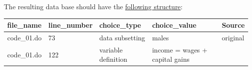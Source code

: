 \documentclass[]{book}
\begin{document}
The resulting data base should have the \href{https://docs.google.com/spreadsheets/d/1nZuJSHswbZgaaIfBcyIUGPwG-WIP8zE1Oambud-WoDc/edit?usp=sharing}{following structure}:

\begin{longtable}[]{@{}lllll@{}}
\toprule
\begin{minipage}[b]{0.10\columnwidth}\raggedright
file\_name\strut
\end{minipage} & \begin{minipage}[b]{0.11\columnwidth}\raggedright
line\_number\strut
\end{minipage} & \begin{minipage}[b]{0.18\columnwidth}\raggedright
choice\_type\strut
\end{minipage} & \begin{minipage}[b]{0.28\columnwidth}\raggedright
choice\_value\strut
\end{minipage} & \begin{minipage}[b]{0.18\columnwidth}\raggedright
Source\strut
\end{minipage}\tabularnewline
\midrule
\endhead
\begin{minipage}[t]{0.10\columnwidth}\raggedright
code\_01.do\strut
\end{minipage} & \begin{minipage}[t]{0.11\columnwidth}\raggedright
73\strut
\end{minipage} & \begin{minipage}[t]{0.18\columnwidth}\raggedright
data subsetting\strut
\end{minipage} & \begin{minipage}[t]{0.28\columnwidth}\raggedright
males\strut
\end{minipage} & \begin{minipage}[t]{0.18\columnwidth}\raggedright
original\strut
\end{minipage}\tabularnewline
\begin{minipage}[t]{0.10\columnwidth}\raggedright
code\_01.do\strut
\end{minipage} & \begin{minipage}[t]{0.11\columnwidth}\raggedright
122\strut
\end{minipage} & \begin{minipage}[t]{0.18\columnwidth}\raggedright
variable definition\strut
\end{minipage} & \begin{minipage}[t]{0.28\columnwidth}\raggedright
income = wages + capital gains\strut
\end{minipage} & \begin{minipage}[t]{0.18\columnwidth}\raggedright

\end{minipage}
\end{longtable}
\end{document}
